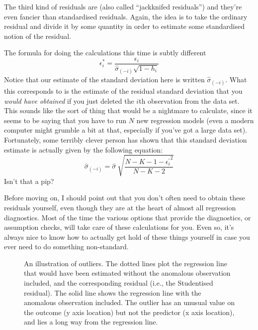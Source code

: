 The third kind of residuals are  (also called ``jackknifed residuals'') and they're even fancier than standardised residuals. Again, the idea is to take the ordinary residual and divide it by some quantity in order to estimate some standardised notion of the residual. 

\vspace{0.6cm}
\begin{mdframed}[style=MyFrame,nobreak=false]
The formula for doing the calculations this time is subtly different
$$
\epsilon_{i}^* = \frac{\epsilon_i}{\hat{\sigma}_{(-i)} \sqrt{1-h_i}}
$$
Notice that our estimate of the standard deviation here is written $\hat{\sigma}_{(-i)}$. What this corresponds to is the estimate of the residual standard deviation that you {\it would have obtained} if you just deleted the $i$th observation from the data set. This sounds like the sort of thing that would be a nightmare to calculate, since it seems to be saying that you have to run $N$ new regression models (even a modern computer might grumble a bit at that, especially if you've got a large data set). Fortunately, some terribly clever person has shown that this standard deviation estimate is actually given by the following equation:
$$
\hat\sigma_{(-i)} = \hat{\sigma} \ \sqrt{\frac{N-K-1 - {\epsilon_{i}^\prime}^2}{N-K-2}}
$$
Isn't that a pip? 
\end{mdframed}

Before moving on, I should point out that you don't often need to obtain these residuals yourself, even though they are at the heart of almost all regression diagnostics. Most of the time the various options that provide the diagnostics, or assumption checks, will take care of these calculations for you. Even so, it's always nice to know how to actually get hold of these things yourself in case you ever need to do something non-standard.



\begin{figure}[!htb]
\begin{center}
\caption{An illustration of outliers. The dotted lines plot the regression line that would have been estimated without the anomalous observation included, and the corresponding residual (i.e., the Studentised residual). The solid line shows the regression line with the anomalous observation included. The outlier has an unusual value on the outcome (y axis location) but not the predictor (x axis location), and lies a long way from the regression line.}
\HR
\label{fig:outlier}
\end{center}
\end{figure}

